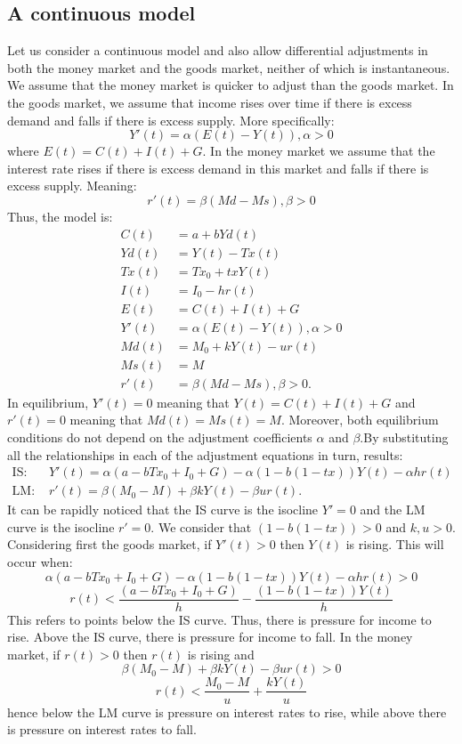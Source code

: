 \documentclass[a4paper,11pt]{report}
\begin{document}
\subsection{A continuous model}
Let us consider a continuous model and also allow differential adjustments in both the money market and the goods market, neither of which is instantaneous. We assume that the money market is quicker to adjust than the goods market. In the goods market, we assume that income rises over time if there is excess demand and falls if there is excess supply. More specifically:
\begin{equation}
 Y'(t)=\alpha(E(t)-Y(t)), \alpha>0
\end{equation}
where $E(t)=C(t)+I(t)+G$. In the money market we assume that the interest rate rises if there is excess demand in this market and falls if there is excess supply. Meaning:
\begin{equation}
 r'(t)=\beta(Md-Ms),\beta>0
\end{equation}
Thus, the model is:
\begin{align}
 C(t)&=a+bYd(t) \\
 Yd(t)&=Y(t)-Tx(t) \\
 Tx(t)&=Tx_{0}+txY(t)\\
 I(t)&=I_{0}-hr(t)\\
 E(t)&=C(t)+I(t)+G\\
 Y'(t)&=\alpha(E(t)-Y(t)), \alpha>0\\
 Md(t)&=M_{0}+kY(t)-ur(t)\\
 Ms(t)&=M\\
 r'(t)&=\beta(Md-Ms),\beta>0.
\end{align}
In equilibrium, $Y'(t)=0$ meaning that $Y(t)=C(t)+I(t)+G$ and $r'(t)=0$ meaning that $Md(t)=Ms(t)=M$. Moreover, both equilibrium conditions do not depend on the adjustment coefficients $\alpha$ and $\beta$.By substituting all the relationships in each of the adjustment equations in turn, results:
\begin{align*}
 \text{IS: }&Y'(t)=\alpha(a-bTx_{0}+I_{0}+G)-\alpha(1-b(1-tx))Y(t)-\alpha hr(t) \\
 \text{LM: } &r'(t)=\beta(M_{0}-M)+\beta k Y(t)-\beta ur(t).
\end{align*}
It can be rapidly noticed that the IS curve is the isocline $Y'=0$ and the LM curve is the isocline $r'=0$. We consider that $(1-b(1-tx))>0$ and $k,u>0$.
Considering first the goods market, if $Y'(t)>0$ then $Y(t)$ is rising. This will occur when:
$$\alpha(a-bTx_{0}+I_{0}+G)-\alpha(1-b(1-tx))Y(t)-\alpha hr(t)>0$$
$$r(t)<\frac{(a-bTx_{0}+I_{0}+G)}{h}-\frac{(1-b(1-tx))Y(t)}{h}$$
This refers to points below the IS curve. Thus, there is pressure for income to rise. Above the IS curve, there is pressure for income to fall.
In the money market, if $r(t)>0$ then $r(t)$ is rising and
$$\beta(M_{0}-M)+\beta kY(t)-\beta ur(t)>0$$
$$r(t)<\frac{M_{0}-M}{u}+\frac{kY(t)}{u}$$
hence below the LM curve is pressure on interest rates to rise, while above there is pressure on interest rates to fall. 
\end{document}
